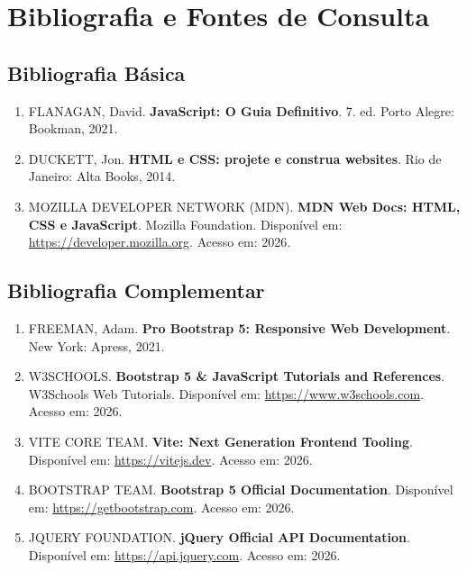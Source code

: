 \documentclass[12pt,a4paper]{article}
\begin{document}
\section{Bibliografia e Fontes de Consulta}

\subsection{Bibliografia Básica}
\begin{enumerate}[leftmargin=*]
    \item FLANAGAN, David. \textbf{JavaScript: O Guia Definitivo}. 7. ed. Porto Alegre: Bookman, 2021.
    \item DUCKETT, Jon. \textbf{HTML e CSS: projete e construa websites}. Rio de Janeiro: Alta Books, 2014.
    \item MOZILLA DEVELOPER NETWORK (MDN). \textbf{MDN Web Docs: HTML, CSS e JavaScript}. Mozilla Foundation. Disponível em: \url{https://developer.mozilla.org}. Acesso em: 2026.
\end{enumerate}

\subsection{Bibliografia Complementar}
\begin{enumerate}[leftmargin=*]
    \item FREEMAN, Adam. \textbf{Pro Bootstrap 5: Responsive Web Development}. New York: Apress, 2021.
    \item W3SCHOOLS. \textbf{Bootstrap 5 \& JavaScript Tutorials and References}. W3Schools Web Tutorials. Disponível em: \url{https://www.w3schools.com}. Acesso em: 2026.
    \item VITE CORE TEAM. \textbf{Vite: Next Generation Frontend Tooling}. Disponível em: \url{https://vitejs.dev}. Acesso em: 2026.
    \item BOOTSTRAP TEAM. \textbf{Bootstrap 5 Official Documentation}. Disponível em: \url{https://getbootstrap.com}. Acesso em: 2026.
    \item JQUERY FOUNDATION. \textbf{jQuery Official API Documentation}. Disponível em: \url{https://api.jquery.com}. Acesso em: 2026.
\end{enumerate}

\vspace{1.2cm}
\end{document}
